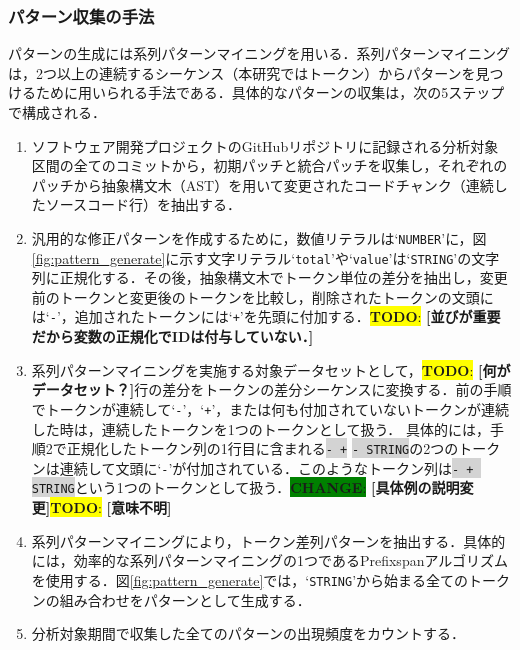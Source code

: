 \documentclass[T,J]{fose} %
\newcommand{\todo}[1]{\colorbox{yellow}{{\bf TODO}:}{\color{red} {\textbf{[#1]}}}}
\newcommand{\change}[1]{\colorbox{green}{{\bf CHANGE}:}{\color{black} {\textbf{[#1]}}}}
\begin{document}
\subsubsection{パターン収集の手法}\label{subsubsec:collect_pattern}

パターンの生成には系列パターンマイニングを用いる．系列パターンマイニングは，2つ以上の連続するシーケンス（本研究ではトークン）からパターンを見つけるために用いられる手法である\cite{freespan}．具体的なパターンの収集は，次の5ステップで構成される．
\begin{enumerate}
    \item ソフトウェア開発プロジェクトのGitHubリポジトリに記録される分析対象区間の全てのコミットから，初期パッチと統合パッチを収集し，それぞれのパッチから抽象構文木（AST）を用いて変更されたコードチャンク（連続したソースコード行）を抽出する．
    \item 汎用的な修正パターンを作成するために，数値リテラルは`\texttt{NUMBER}'に，図\ref{fig:pattern_generate}に示す文字リテラル`\texttt{total}'や`\texttt{value}'は`\texttt{STRING}'の文字列に正規化する．その後，抽象構文木でトークン単位の差分を抽出し，変更前のトークンと変更後のトークンを比較し，削除されたトークンの文頭には`\texttt{-}'，追加されたトークンには`\texttt{+}'を先頭に付加する．\todo{並びが重要だから変数の正規化でIDは付与していない．}
    \item 系列パターンマイニングを実施する対象データセットとして，\todo{何がデータセット？}行の差分をトークンの差分シーケンスに変換する．前の手順でトークンが連続して`\texttt{-}'，`\texttt{+}'，または何も付加されていないトークンが連続した時は，連続したトークンを1つのトークンとして扱う．
    具体的には，手順2で正規化したトークン列の1行目に含まれる\colorbox{lightgray}{\texttt{- +}} \colorbox{lightgray}{\texttt{- STRING}}の2つのトークンは連続して文頭に`\texttt{-}'が付加されている．このようなトークン列は\colorbox{lightgray}{\texttt{- + STRING}}という1つのトークンとして扱う．\change{具体例の説明変更}\todo{意味不明}
    \item 系列パターンマイニングにより，トークン差列パターンを抽出する．具体的には，効率的な系列パターンマイニングの1つであるPrefixspanアルゴリズムを使用する\cite{prefixspan}．図\ref{fig:pattern_generate}では，`\texttt{STRING}'から始まる全てのトークンの組み合わせをパターンとして生成する．
    \item 分析対象期間で収集した全てのパターンの出現頻度をカウントする．
\end{enumerate}
\end{document}
